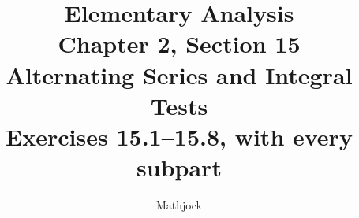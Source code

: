 
\title{\textbf{Elementary Analysis}\\[0.3em]
Chapter 2, Section 15\\[0.3em]
\large Alternating Series and Integral Tests\\
Exercises 15.1--15.8, with every subpart}
\author{Mathjock}
\date{}

\maketitle
\bookinfo
\tableofcontents
\clearpage
\setcounter{section}{14}


